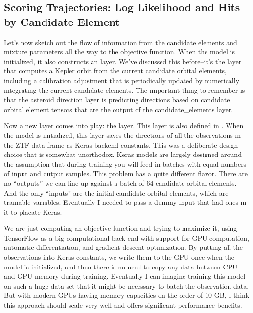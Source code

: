 \subsection{Scoring Trajectories: Log Likelihood and Hits by Candidate Element}
Let's now sketch out the flow of information from the candidate elements and mixture parameters all the way to the objective function.
When the model is initialized, it also constructs an  layer.
We've discussed this before--it's the layer that computes a Kepler orbit from the current candidate orbital elements,
including a calibration adjustment that is periodically updated by numerically integrating the current candidate elements.
The important thing to remember is that the asteroid direction layer is predicting directions based on candidate orbital element tensors
that are the output of the candidate\_elements layer.

Now a new layer comes into play: the  layer.
This layer is also defined in .
When the model is initialized, this layer saves the directions of all the observations in the ZTF data frame as Keras backend constants.
This was a deliberate design choice that is somewhat unorthodox.
Keras models are largely designed around the assumption that during training you will feed in batches with equal numbers of input and output samples.
This problem has a quite different flavor.
There are no ``outputs'' we can line up against a batch of 64 candidate orbital elements.
And the only ``inputs'' are the initial candidate orbital elements, which are trainable variables.
Eventually I needed to pass a dummy input that had  ones in it to placate Keras.

We are just computing an objective function and trying to maximize it, using TensorFlow as a big computational back end with
support for GPU computation, automatic differentiation, and gradient descent optimization.
By putting all the observations into Keras constants, we write them to the GPU once when the model is initialized,
and then there is no need to copy any data between CPU and GPU memory during training.
Eventually I can imagine training this model on such a huge data set that it might be necessary to batch the observation data.
But with modern GPUs having memory capacities on the order of 10 GB, I think this approach should scale very well and offers significant performance benefits.

